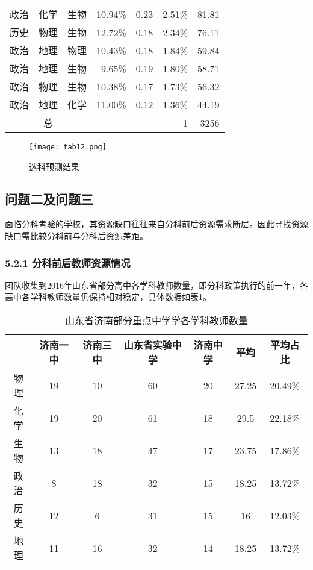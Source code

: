 \documentclass[bwprint]{cumcmthesis}
\begin{document}
\begin{longtable}{cccrrrr}
		\multicolumn{1}{l}{政治} & \multicolumn{1}{l}{化学} & \multicolumn{1}{l}{生物} & 10.94\% & 0.23  & 2.51\% & 81.81  \\
		\multicolumn{1}{l}{历史} & \multicolumn{1}{l}{物理} & \multicolumn{1}{l}{生物} & 12.72\% & 0.18  & 2.34\% & 76.11  \\
		\multicolumn{1}{l}{政治} & \multicolumn{1}{l}{地理} & \multicolumn{1}{l}{物理} & 10.43\% & 0.18  & 1.84\% & 59.84  \\
		\multicolumn{1}{l}{政治} & \multicolumn{1}{l}{地理} & \multicolumn{1}{l}{生物} & 9.65\% & 0.19  & 1.80\% & 58.71  \\
		\multicolumn{1}{l}{政治} & \multicolumn{1}{l}{物理} & \multicolumn{1}{l}{生物} & 10.38\% & 0.17  & 1.73\% & 56.32  \\
		\multicolumn{1}{l}{政治} & \multicolumn{1}{l}{地理} & \multicolumn{1}{l}{化学} & 11.00\% & 0.12  & 1.36\% & 44.19  \\
		\midrule
		\multicolumn{3}{c}{总} &       &       & 1     & 3256 \\
		\bottomrule
		
	\end{longtable}%

\begin{figure}[!ht]
	\centering
	\texttt{[image: tab12.png]}
	\caption{选科预测结果}
\end{figure}
\newpage

\subsection{问题二及问题三}

面临分科考验的学校，其资源缺口往往来自分科前后资源需求断层。因此寻找资源缺口需比较分科前与分科后资源差距。

\subsubsection{5.2.1 分科前后教师资源情况}
团队收集到2016年山东省部分高中各学科教师数量，即分科政策执行的前一年，各高中各学科教师数量仍保持相对稳定，具体数据如表\ref{tab:teacher_num}。

\begin{longtable}{ccccccc}
	\caption{\label{tab:teacher_num}山东省济南部分重点中学学各学科教师数量}\\
	\toprule
	& 济南一中  & 济南三中  & 山东省实验中学 & 济南中学  & 平均    & 平均占比 \\
	\midrule
	物理    & 19    & 10    & 60    & 20    & 27.25 & 20.49\% \\
	化学    & 19    & 20    & 61    & 18    & 29.5  & 22.18\% \\
	生物    & 13    & 18    & 47    & 17    & 23.75 & 17.86\% \\
	政治    & 8     & 18    & 32    & 15    & 18.25 & 13.72\% \\
	历史    & 12    & 6     & 31    & 15    & 16    & 12.03\% \\
	地理    & 11    & 16    & 32    & 14    & 18.25 & 13.72\% \\
	\bottomrule
\end{longtable}%
\end{document}
